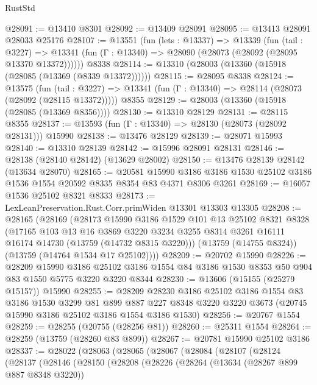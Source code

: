\begin{lexlean}{RustStd}
\begin{coremodule}
@28091 := @13410 @8301
@28092 := @13409 @28091
@28095 := @13413 @28091 @28033 @25176
@28107 := @13551
    (fun (lets : @13337) =>
    @13339
      (fun (tail : @3227) =>
      @13341 (fun (Γ : @13340) => @28090 (@28073 (@28092 (@28095 @13370 @13372))))))
    @8338
@28114 := @13310 (@28003 (@13360 (@15918 (@28085 (@13369 (@8339 @13372))))))
@28115 := @28095 @8338
@28124 := @13575
    (fun (tail : @3227) => @13341 (fun (Γ : @13340) => @28114 (@28073 (@28092 (@28115 @13372)))))
    @8355
@28129 := @28003 (@13360 (@15918 (@28085 (@13369 @8356))))
@28130 := @13310 @28129
@28131 := @28115 @8355
@28137 := @13593 (fun (Γ : @13340) => @28130 (@28073 (@28092 @28131))) @15990
@28138 := @13476 @28129
@28139 := @28071 @15993
@28140 := @13310 @28139
@28142 := @15996 @28091 @28131
@28146 := @28138 (@28140 @28142) (@13629 @28002)
@28150 := @13476 @28139 @28142 (@13634 @28070)
@28165 := @20581
    @15990
    @3186
    @3186
    @1530
    @25102
    @3186
    @1536
    @1554
    @20592
    @8335
    @8354
    @83
    @4371
    @8306
    @3261
@28169 := @16057 @1536 @25102 @8321 @8333
@28173 := LexLeanPreservation.Rust.Corr.primWiden @13301 @13303 @13305
@28208 := @28165
    (@28169
      (@28173
        @15990
        @3186
        @1529
        @101
        @13
        @25102
        @8321
        @8328
        (@17165
          @103
          @13
          @16
          @3869
          @3220
          @3234
          @3255
          @8314
          @3261
          @16111
          @16174
          @14730
          (@13759 (@14732 @8315 @3220)))
        (@13759 (@14755 @8324))
        (@13759 (@14764 @1534 @17 @25102))))
@28209 := @20702 @15990
@28226 := @28209
    @15990
    @3186
    @25102
    @3186
    @1554
    @84
    @3186
    @1530
    @8353
    @50
    @904
    @83
    @1550
    @5775
    @3220
    @3220
    @8344
@28230 := @13606 (@15155 (@25279 @15157)) @15990
@28255 := @28209
    @28230
    @3186
    @25102
    @3186
    @1554
    @83
    @3186
    @1530
    @3299
    @81
    @899
    @887
    @227
    @8348
    @3220
    @3220
    @3673
    (@20745 @15990 @3186 @25102 @3186 @1554 @3186 @1530)
@28256 := @20767 @1554
@28259 := @28255 (@20755 (@28256 @81))
@28260 := @25311 @1554
@28264 := @28259 (@13759 (@28260 @83 @899))
@28267 := @20781 @15990 @25102 @3186
@28337 := @28022
    (@28063
      (@28065
        (@28067
          (@28084
            (@28107
              (@28124
                (@28137
                  (@28146
                    (@28150
                      (@28208
                        (@28226
                          (@28264
                            (@13634 (@28267 @899 @887 @8348 @3220))

\end{coremodule}
\end{lexlean}
